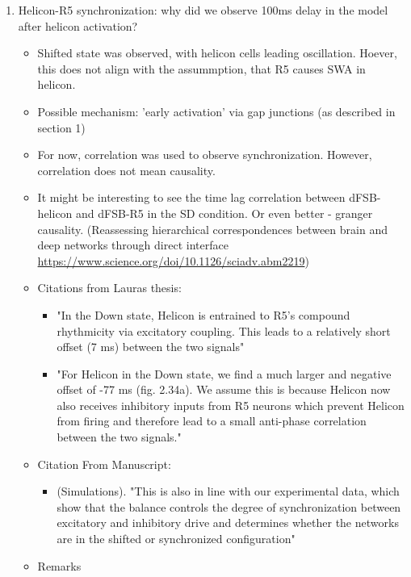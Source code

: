 \documentclass[11pt]{article}
\begin{document}
\begin{enumerate}
    \item Helicon-R5 synchronization: why did we observe 100ms delay in the model after
    helicon activation?
    \begin{itemize}
        \item Shifted state was observed, with helicon cells leading oscillation. Hoever, this
        does not align with the assummption, that R5 causes SWA in helicon.
        \item Possible mechanism: 'early activation' via gap junctions (as described in section 1)
        \item For now, correlation was used to observe synchronization. However,
        correlation does not mean causality.
        \item It might be interesting
        to see the time lag correlation between dFSB-helicon and dFSB-R5 in the SD condition.
        Or even better - granger causality.
        (Reassessing hierarchical correspondences between brain and deep networks through direct interface
        \url{https://www.science.org/doi/10.1126/sciadv.abm2219})
        \item Citations from Lauras thesis:
        \begin{itemize}
            \item "In the Down state, Helicon is entrained to R5's compound rhythmicity via excitatory
            coupling. This leads to a relatively short offset (7 ms) between the two signals"
            \item "For Helicon in the Down state, we find a much larger and negative offset of 
            -77 ms (fig. 2.34a). We assume this is because Helicon now also receives inhibitory inputs
            from R5 neurons which prevent Helicon from firing and therefore lead to a small anti-phase
            correlation between the two signals."
        \end{itemize}
        \item Citation From Manuscript:
        \begin{itemize}
            \item (Simulations). "This is also in line with our experimental data, which show
            that the balance controls the degree of synchronization between excitatory and inhibitory
            drive and determines whether the networks are in the shifted or synchronized configuration"
        \end{itemize}
        \item Remarks
        \begin{itemize}

\end{itemize}
\end{itemize}
\end{enumerate}
\end{document}
